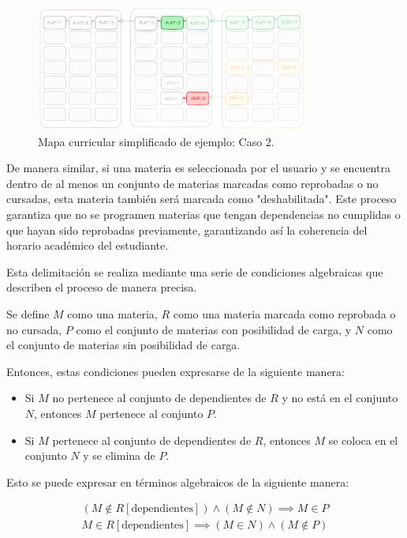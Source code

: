\clearpage

\begin{figure}[h]
    \centering
    \includegraphics[width=0.8\textwidth]{images/AG-Simple-Serial-Squeme-2.png}
    \caption{Mapa curricular simplificado de ejemplo: Caso 2.}
    \label{fig:mapa_curricular_simplificado_caso_2}
\end{figure}
    
De manera similar, si una materia es seleccionada por el usuario y se encuentra dentro de al menos un conjunto de materias marcadas como reprobadas o no cursadas, esta materia también será marcada como "deshabilitada". Este proceso garantiza que no se programen materias que tengan dependencias no cumplidas o que hayan sido reprobadas previamente, garantizando así la coherencia del horario académico del estudiante.

Esta delimitación se realiza mediante una serie de condiciones algebraicas que describen el proceso de manera precisa.

Se define \( M \) como una materia, \( R \) como una materia marcada como reprobada o no cursada, \( P \) como el conjunto de materias con posibilidad de carga, y \( N \) como el conjunto de materias sin posibilidad de carga.

Entonces, estas condiciones pueden expresarse de la siguiente manera:

\begin{itemize}
    \item Si \( M \) no pertenece al conjunto de dependientes de \( R \) y no está en el conjunto \( N \), entonces \( M \) pertenece al conjunto \( P \).
    \item Si \( M \) pertenece al conjunto de dependientes de \( R \), entonces \( M \) se coloca en el conjunto \( N \) y se elimina de \( P \).
\end{itemize}

Esto se puede expresar en términos algebraicos de la siguiente manera:

\begin{equation}
    \begin{split}
        (M \notin R[\text{dependientes}]) \wedge (M \notin N) \implies M \in P \\
        M \in R[\text{dependientes}] \implies (M \in N) \wedge (M \notin P )
    \end{split}
    \label{Condición explícita de materias disponibles.}
\end{equation} 

